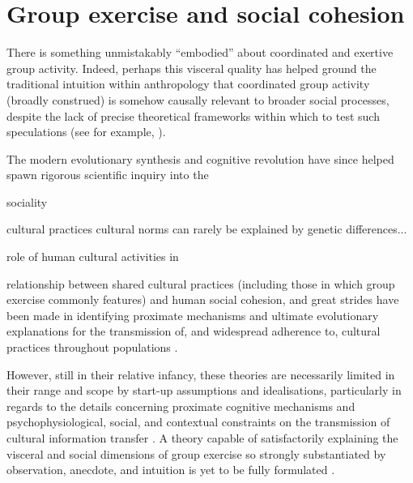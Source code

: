 


\section{Group exercise and social cohesion}
There is something unmistakably ``embodied'' about coordinated and exertive group activity.
Indeed, perhaps this visceral quality has helped ground the traditional intuition within anthropology that coordinated group activity (broadly construed) is somehow causally relevant to broader social processes, despite the lack of precise theoretical frameworks within which to test such speculations (see for example, \citep{Durkheim1965,Mauss1935,Radcliffe-Brown1952,Turner1974,Merleau-Ponty1956,Bourdieu1990}).

The modern evolutionary synthesis and cognitive revolution have since helped spawn rigorous scientific inquiry into the

sociality

cultural practices
cultural norms can rarely be explained by genetic differences...

 role of human cultural activities in

 relationship between shared cultural practices (including those in which group exercise commonly features) and human social cohesion, and great strides have been made in identifying proximate mechanisms and ultimate evolutionary explanations for the transmission of, and widespread adherence to, cultural practices throughout populations \citep{Dawkins1976,Boyd1988,Sperber1996,Barrett2002,Whitehouse2004,Whitehouse2014,Henrich2007}.

 However, still in their relative infancy, these theories are necessarily limited in their range and scope by start-up assumptions and idealisations, particularly in regards to the details concerning proximate cognitive mechanisms and psychophysiological, social, and contextual constraints on the transmission of cultural information transfer \citep{Sperber1996,Dunbar2012,Claidiere2014}. A theory capable of satisfactorily explaining the visceral and social dimensions of group exercise so strongly substantiated by observation, anecdote, and intuition is yet to be fully formulated \citep{Cohen2017}.

